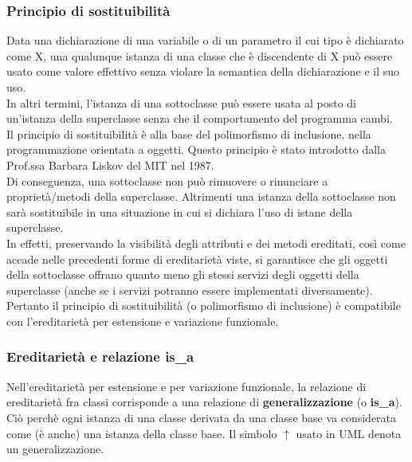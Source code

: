 \documentclass{article}
\begin{document}
	\subsubsection{Principio di sostituibilità}
	Data una dichiarazione di una variabile o di un parametro il cui tipo è dichiarato come X, una qualunque istanza di una classe che è discendente di X può essere usato come valore effettivo senza violare la semantica della dichiarazione e il suo uso.
	\\
	In altri termini, l'istanza di una sottoclasse può essere usata al posto di un'istanza della superclasse senza che il comportamento del programma cambi.
	\vspace{\baselineskip} \\
	Il principio di sostituibilità è alla base del polimorfismo di inclusione, nella programmazione orientata a oggetti. Questo principio è stato introdotto dalla Prof.ssa Barbara Liskov del MIT nel 1987.
	\vspace{\baselineskip} \\
	Di conseguenza, una sottoclasse non può rimuovere o rinunciare a proprietà/metodi della superclasse. Altrimenti una istanza della sottoclasse non sarà sostituibile in una situazione in cui si dichiara l'uso di istane della superclasse.
	\vspace{\baselineskip} \\
	In effetti, preservando la visibilità degli attributi e dei metodi ereditati, così come accade nelle precedenti forme di ereditarietà viste, si garantisce che gli oggetti della sottoclasse offrano quanto meno gli stessi servizi degli oggetti della superclasse (anche se i servizi potranno essere implementati diversamente).
	\vspace{\baselineskip} \\
	Pertanto il principio di sostituibilità (o polimorfismo di inclusione) è compatibile con l'ereditarietà per estensione e variazione funzionale.

	\subsubsection{Ereditarietà e relazione is\_a}
	Nell'ereditarietà per estensione e per variazione funzionale, la relazione di ereditarietà fra classi corrisponde a una relazione di \textbf{generalizzazione} (o \textbf{is\_a}). Ciò perchè ogni istanza di una classe derivata da una classe base va considerata come (è anche) una istanza della classe base.
	Il simbolo $\uparrow$ usato in UML denota un generalizzazione.
\end{document}
